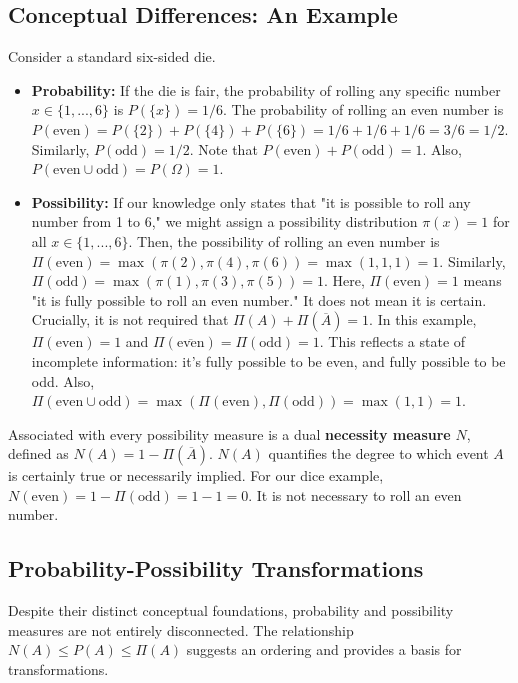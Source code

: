 \subsection{Conceptual Differences: An Example}
Consider a standard six-sided die.
\begin{itemize}
    \item \textbf{Probability:} If the die is fair, the probability of rolling any specific number $x \in \{1, ..., 6\}$ is $P(\{x\}) = 1/6$.
    The probability of rolling an even number is $P(\text{even}) = P(\{2\}) + P(\{4\}) + P(\{6\}) = 1/6 + 1/6 + 1/6 = 3/6 = 1/2$.
    Similarly, $P(\text{odd}) = 1/2$. Note that $P(\text{even}) + P(\text{odd}) = 1$.
    Also, $P(\text{even} \cup \text{odd}) = P(\Omega) = 1$.

    \item \textbf{Possibility:} If our knowledge only states that "it is possible to roll any number from 1 to 6," we might assign a possibility distribution $\pi(x) = 1$ for all $x \in \{1, ..., 6\}$.
    Then, the possibility of rolling an even number is $\Pi(\text{even}) = \max(\pi(2), \pi(4), \pi(6)) = \max(1,1,1) = 1$.
    Similarly, $\Pi(\text{odd}) = \max(\pi(1), \pi(3), \pi(5)) = 1$.
    Here, $\Pi(\text{even}) = 1$ means "it is fully possible to roll an even number." It does not mean it is certain.
    Crucially, it is not required that $\Pi(A) + \Pi(\overline{A}) = 1$. In this example, $\Pi(\text{even}) = 1$ and $\Pi(\overline{\text{even}}) = \Pi(\text{odd}) = 1$. This reflects a state of incomplete information: it's fully possible to be even, and fully possible to be odd.
    Also, $\Pi(\text{even} \cup \text{odd}) = \max(\Pi(\text{even}), \Pi(\text{odd})) = \max(1,1) = 1$.
\end{itemize}
Associated with every possibility measure is a dual \textbf{necessity measure} $N$, defined as $N(A) = 1 - \Pi(\overline{A})$. $N(A)$ quantifies the degree to which event $A$ is certainly true or necessarily implied. For our dice example, $N(\text{even}) = 1 - \Pi(\text{odd}) = 1 - 1 = 0$. It is not necessary to roll an even number.

\subsection{Probability-Possibility Transformations}
Despite their distinct conceptual foundations, probability and possibility measures are not entirely disconnected. The relationship $N(A) \le P(A) \le \Pi(A)$ suggests an ordering and provides a basis for transformations.

